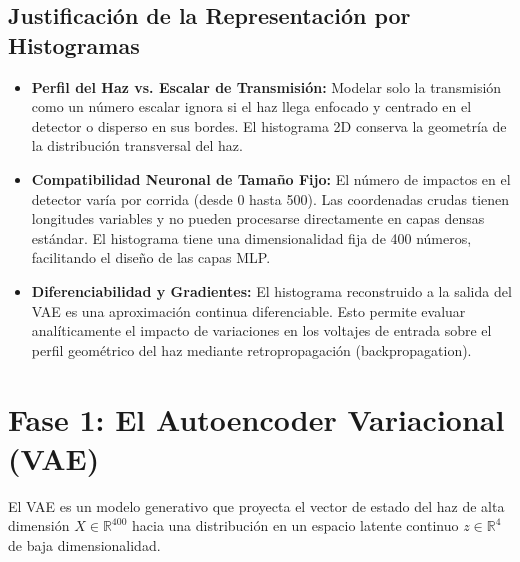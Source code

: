 \documentclass[12pt,letterpaper]{article}
\begin{document}
\subsection{Justificación de la Representación por Histogramas}
\begin{itemize}
    \item \textbf{Perfil del Haz vs. Escalar de Transmisión:} Modelar solo la transmisión como un número escalar ignora si el haz llega enfocado y centrado en el detector o disperso en sus bordes. El histograma 2D conserva la geometría de la distribución transversal del haz.
    \item \textbf{Compatibilidad Neuronal de Tamaño Fijo:} El número de impactos en el detector varía por corrida (desde 0 hasta 500). Las coordenadas crudas tienen longitudes variables y no pueden procesarse directamente en capas densas estándar. El histograma tiene una dimensionalidad fija de 400 números, facilitando el diseño de las capas MLP.
    \item \textbf{Diferenciabilidad y Gradientes:} El histograma reconstruido a la salida del VAE es una aproximación continua diferenciable. Esto permite evaluar analíticamente el impacto de variaciones en los voltajes de entrada sobre el perfil geométrico del haz mediante retropropagación (backpropagation).
\end{itemize}

\section{Fase 1: El Autoencoder Variacional (VAE)}
El VAE es un modelo generativo que proyecta el vector de estado del haz de alta dimensión $X \in \mathbb{R}^{400}$ hacia una distribución en un espacio latente continuo $z \in \mathbb{R}^4$ de baja dimensionalidad.
\end{document}
